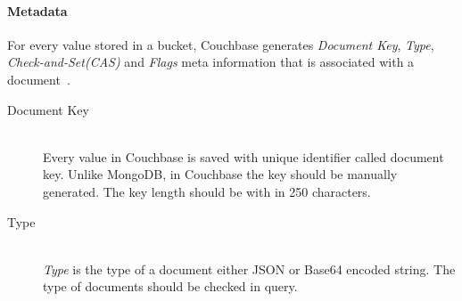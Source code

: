 \paragraph{Metadata}\label{cb-metadata}
For every value stored in a bucket, Couchbase generates \textit{Document Key}, \textit{Type}, \textit{Check-and-Set(CAS)} and \textit{Flags}  meta information that is associated with a document~\cite[p. 26]{cb/ostrovsky2014pro}. 
\begin{description}
\item[Document Key] \hfill \\
 Every value in Couchbase is saved with unique identifier called document key. Unlike MongoDB, in Couchbase the key should be manually generated. The key length should be with in 250 characters.
 
 
\item[Type] \hfill \\
 \textit{Type} is the type of a document either JSON or Base64 encoded string. The type of documents should be checked in query. 
 

\end{description}	

